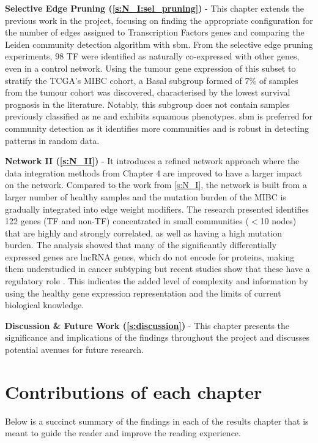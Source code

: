 \textbf{Selective Edge Pruning (\cref{s:N_I:sel_pruning})} - This chapter extends the previous work in the project, focusing on finding the appropriate configuration for the number of edges assigned to Transcription Factors genes and comparing the Leiden community detection algorithm with \acrfull{sbm}. From the selective edge pruning experiments, 98 TF were identified as naturally co-expressed with other genes, even in a control network. Using the tumour gene expression of this subset to stratify the TCGA's MIBC cohort, a Basal subgroup formed of 7\% of samples from the tumour cohort was discovered, characterised by the lowest survival prognosis in the literature. Notably, this subgroup does not contain samples previously classified as \acrlong{ne} and exhibits squamous phenotypes. \acrshort{sbm} is preferred for community detection as it identifies more communities and is robust in detecting patterns in random data.


\textbf{Network II (\cref{s:N_II})} - It introduces a refined network approach where the data integration methods from Chapter 4 are improved to have a larger impact on the network. Compared to the work from \cref{s:N_I}, the network is built from a larger number of healthy samples and the mutation burden of the MIBC is gradually integrated into edge weight modifiers. The research presented identifies 122 genes (TF and non-TF) concentrated in small communities (\(<\)10 nodes) that are highly and strongly correlated, as well as having a high mutation burden. The analysis showed that many of the significantly differentially expressed genes are \acrlong{lncRNA} genes, which do not encode for proteins, making them understudied in cancer subtyping but recent studies show that these have a regulatory role \citep{Statello2021-md}. This indicates the added level of complexity and information by using the healthy gene expression representation and the limits of current biological knowledge.


\textbf{Discussion \& Future Work (\cref{s:discussion})} - This chapter presents the significance and implications of the findings throughout the project and discusses potential avenues for future research.


\section{Contributions of each chapter}

Below is a succinct summary of the findings in each of the results chapter that is meant to guide the reader and improve the reading experience.

